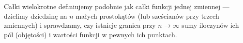 Całki wielokrotne definiujemy podobnie jak całki funkcji jednej zmiennej --- dzielimy dziedzinę na $n$ małych prostokątów (lub sześcianów przy trzech zmiennych) i sprawdzamy, czy istnieje granica przy $n \to \infty$ sumy iloczynów ich pól (objętości) i wartości funkcji w pewnych ich punktach.

\begin{figure}[H]
    \centering
\end{figure}
